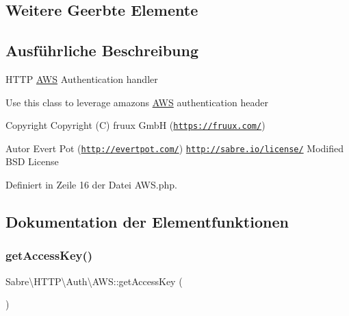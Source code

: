 \subsection*{Weitere Geerbte Elemente}


\subsection{Ausführliche Beschreibung}
H\+T\+TP \mbox{\hyperlink{class_sabre_1_1_h_t_t_p_1_1_auth_1_1_a_w_s}{A\+WS}} Authentication handler

Use this class to leverage amazon\textquotesingle{}s \mbox{\hyperlink{class_sabre_1_1_h_t_t_p_1_1_auth_1_1_a_w_s}{A\+WS}} authentication header

\begin{DoxyCopyright}{Copyright}
Copyright (C) fruux GmbH (\href{https://fruux.com/}{\tt https\+://fruux.\+com/}) 
\end{DoxyCopyright}
\begin{DoxyAuthor}{Autor}
Evert Pot (\href{http://evertpot.com/}{\tt http\+://evertpot.\+com/})  \href{http://sabre.io/license/}{\tt http\+://sabre.\+io/license/} Modified B\+SD License 
\end{DoxyAuthor}


Definiert in Zeile 16 der Datei A\+W\+S.\+php.



\subsection{Dokumentation der Elementfunktionen}
\mbox{\label{class_sabre_1_1_h_t_t_p_1_1_auth_1_1_a_w_s_a321a5193ac6b88c2667fb2c23b8ff79e}} 
\subsubsection{\texorpdfstring{get\+Access\+Key()}{getAccessKey()}}
{\footnotesize\ttfamily Sabre\textbackslash{}\+H\+T\+T\+P\textbackslash{}\+Auth\textbackslash{}\+A\+W\+S\+::get\+Access\+Key (\begin{DoxyParamCaption}{ }\end{DoxyParamCaption})}

